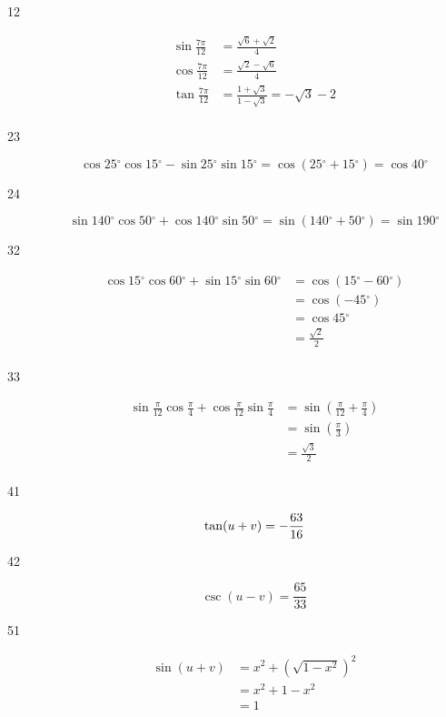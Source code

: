 \documentclass[fleqn,addpoints]{exam}
\newcommand{\degree}{\ensuremath{^\circ}}
\begin{document}
\begin{description}
\item[12]
\begin{align*}
  \sin \frac{7 \pi}{12} &= \frac{\sqrt{6} + \sqrt{2}}{4} \\
  \cos \frac{7 \pi}{12} &= \frac{\sqrt{2} - \sqrt{6}}{4} \\
  \tan \frac{7 \pi}{12} &= \frac{1 + \sqrt{3}}{1 - \sqrt{3}} = -\sqrt{3} - 2 \\
\end{align*}

\item[23]
\[
  \cos 25 \degree \cos 15 \degree - \sin 25 \degree \sin 15 \degree = \cos(25 \degree + 15 \degree) = \cos 40 \degree
\]

\item[24]
\[
  \sin 140 \degree \cos 50 \degree + \cos 140 \degree \sin 50 \degree = \sin(140 \degree + 50 \degree) = \sin 190 \degree
\]

\item[32]
\begin{align*}
  \cos 15 \degree \cos 60 \degree + \sin 15 \degree \sin 60 \degree &= \cos (15 \degree -  60 \degree) \\
  &= \cos (- 45 \degree) \\
  &= \cos 45 \degree \\
  &= \frac{\sqrt{2}}{2} \\
\end{align*}

\item[33]
\begin{align*}
  \sin \frac{\pi}{12} \cos \frac{\pi}{4} + \cos \frac{\pi}{12} \sin \frac{\pi}{4} &= \sin \left (\frac{\pi}{12} + \frac{\pi}{4} \right) \\
    &= \sin \left( \frac{\pi}{3} \right) \\
    &= \frac{\sqrt{3}} {2} \\
\end{align*}

\item[41]
\[
  \tan(u + v) = - \frac{63}{16} \\
\]

\item[42]
\[
  \csc(u-v) = \frac{65}{33}
\]

\item[51]
\begin{align*}
  \sin(u+v) &= x^2 + (\sqrt{1-x^2})^2  \\
  &= x^2 + 1 - x^2 \\
  &= 1 \\
\end{align*}


\end{description}
\end{document}
